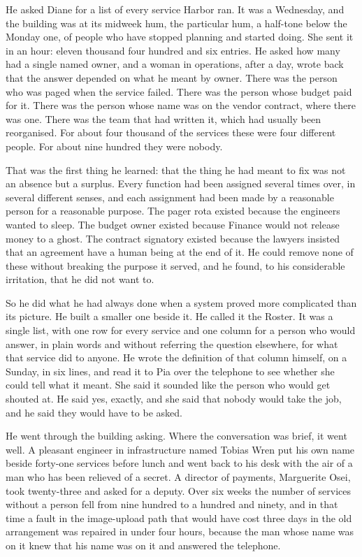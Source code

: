 He asked Diane for a list of every service Harbor ran. It was a Wednesday, and the building was at its midweek hum, the particular hum, a half-tone below the Monday one, of people who have stopped planning and started doing. She sent it in an hour: eleven thousand four hundred and six entries. He asked how many had a single named owner, and a woman in operations, after a day, wrote back that the answer depended on what he meant by owner. There was the person who was paged when the service failed. There was the person whose budget paid for it. There was the person whose name was on the vendor contract, where there was one. There was the team that had written it, which had usually been reorganised. For about four thousand of the services these were four different people. For about nine hundred they were nobody.

That was the first thing he learned: that the thing he had meant to fix was not an absence but a surplus. Every function had been assigned several times over, in several different senses, and each assignment had been made by a reasonable person for a reasonable purpose. The pager rota existed because the engineers wanted to sleep. The budget owner existed because Finance would not release money to a ghost. The contract signatory existed because the lawyers insisted that an agreement have a human being at the end of it. He could remove none of these without breaking the purpose it served, and he found, to his considerable irritation, that he did not want to.

So he did what he had always done when a system proved more complicated than its picture. He built a smaller one beside it. He called it the Roster. It was a single list, with one row for every service and one column for a person who would answer, in plain words and without referring the question elsewhere, for what that service did to anyone. He wrote the definition of that column himself, on a Sunday, in six lines, and read it to Pia over the telephone to see whether she could tell what it meant. She said it sounded like the person who would get shouted at. He said yes, exactly, and she said that nobody would take the job, and he said they would have to be asked.

He went through the building asking. Where the conversation was brief, it went well. A pleasant engineer in infrastructure named Tobias Wren put his own name beside forty-one services before lunch and went back to his desk with the air of a man who has been relieved of a secret. A director of payments, Marguerite Osei, took twenty-three and asked for a deputy. Over six weeks the number of services without a person fell from nine hundred to a hundred and ninety, and in that time a fault in the image-upload path that would have cost three days in the old arrangement was repaired in under four hours, because the man whose name was on it knew that his name was on it and answered the telephone.


